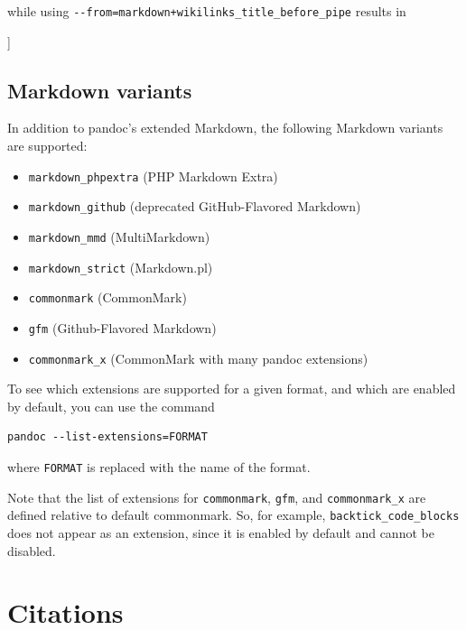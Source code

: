 \documentclass[
]{article}
\newenvironment{Shaded}{}{}
\newcommand{\NormalTok}[1]{#1}
\providecommand{\tightlist}{%
  \setlength{\itemsep}{0pt}\setlength{\parskip}{0pt}}
\begin{document}
while using \texttt{-\/-from=markdown+wikilinks\_title\_before\_pipe}
results in

\begin{Shaded}
\begin{Highlighting}[]
\NormalTok{[[title|URL]]}
\end{Highlighting}
\end{Shaded}

\hypertarget{markdown-variants}{%
\subsection{Markdown variants}\label{markdown-variants}}

In addition to pandoc's extended Markdown, the following Markdown
variants are supported:

\begin{itemize}
\tightlist
\item
  \texttt{markdown\_phpextra} (PHP Markdown Extra)
\item
  \texttt{markdown\_github} (deprecated GitHub-Flavored Markdown)
\item
  \texttt{markdown\_mmd} (MultiMarkdown)
\item
  \texttt{markdown\_strict} (Markdown.pl)
\item
  \texttt{commonmark} (CommonMark)
\item
  \texttt{gfm} (Github-Flavored Markdown)
\item
  \texttt{commonmark\_x} (CommonMark with many pandoc extensions)
\end{itemize}

To see which extensions are supported for a given format, and which are
enabled by default, you can use the command

\begin{verbatim}
pandoc --list-extensions=FORMAT
\end{verbatim}

where \texttt{FORMAT} is replaced with the name of the format.

Note that the list of extensions for \texttt{commonmark}, \texttt{gfm},
and \texttt{commonmark\_x} are defined relative to default commonmark.
So, for example, \texttt{backtick\_code\_blocks} does not appear as an
extension, since it is enabled by default and cannot be disabled.

\hypertarget{citations}{%
\section{Citations}\label{citations}}
\end{document}
